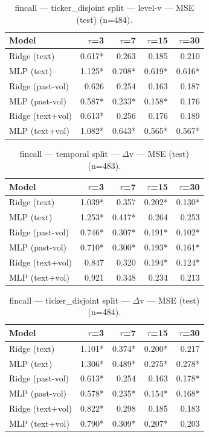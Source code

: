 \begin{table}[t]
\centering
\begin{tabular}{lrrrr}
\toprule
Model & $\tau$=3 & $\tau$=7 & $\tau$=15 & $\tau$=30 \\
\midrule
Ridge (text) & 0.617* & 0.263 & 0.185 & 0.210 \\
MLP (text) & 1.125* & 0.708* & 0.619* & 0.616* \\
Ridge (past-vol) & 0.626 & 0.254 & 0.163 & 0.187 \\
MLP (past-vol) & 0.587* & 0.233* & 0.158* & 0.176 \\
Ridge (text+vol) & 0.613* & 0.256 & 0.176 & 0.189 \\
MLP (text+vol) & 1.082* & 0.643* & 0.565* & 0.567* \\
\bottomrule
\end{tabular}
\caption{fincall — ticker\_disjoint split — level-v — MSE (test) (n=484).}
\end{table}

\begin{table}[t]
\centering
\begin{tabular}{lrrrr}
\toprule
Model & $\tau$=3 & $\tau$=7 & $\tau$=15 & $\tau$=30 \\
\midrule
Ridge (text) & 1.039* & 0.357 & 0.202* & 0.130* \\
MLP (text) & 1.253* & 0.417* & 0.264 & 0.253 \\
Ridge (past-vol) & 0.746* & 0.307* & 0.191* & 0.102* \\
MLP (past-vol) & 0.710* & 0.300* & 0.193* & 0.161* \\
Ridge (text+vol) & 0.847 & 0.320 & 0.194* & 0.124* \\
MLP (text+vol) & 0.921 & 0.348 & 0.234 & 0.213 \\
\bottomrule
\end{tabular}
\caption{fincall — temporal split — $\Delta$v — MSE (test) (n=483).}
\end{table}

\begin{table}[t]
\centering
\begin{tabular}{lrrrr}
\toprule
Model & $\tau$=3 & $\tau$=7 & $\tau$=15 & $\tau$=30 \\
\midrule
Ridge (text) & 1.101* & 0.374* & 0.200* & 0.217 \\
MLP (text) & 1.306* & 0.489* & 0.275* & 0.278* \\
Ridge (past-vol) & 0.613* & 0.254 & 0.163 & 0.178* \\
MLP (past-vol) & 0.578* & 0.235* & 0.154* & 0.168* \\
Ridge (text+vol) & 0.822* & 0.298 & 0.185 & 0.183 \\
MLP (text+vol) & 0.790* & 0.309* & 0.207* & 0.203 \\
\bottomrule
\end{tabular}
\caption{fincall — ticker\_disjoint split — $\Delta$v — MSE (test) (n=484).}
\end{table}

